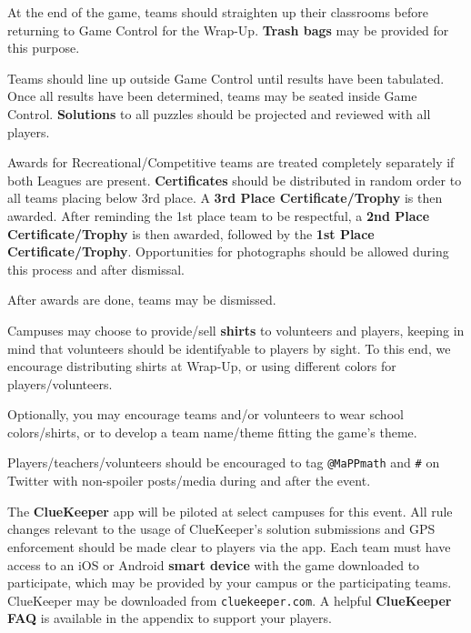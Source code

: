 
At the end of the game, teams should straighten up their classrooms before
returning to Game Control for the Wrap-Up. \textbf{Trash bags} may be
provided for this purpose.

Teams should line up outside Game Control until results have been tabulated.
Once all results have been determined, teams may be seated inside Game Control.
\textbf{Solutions} to all puzzles should be projected and reviewed with
all players.

Awards for Recreational/Competitive teams are treated completely separately
if both Leagues are present.
\textbf{Certificates} should be distributed in random order to all teams placing
below 3rd place. A \textbf{3rd Place Certificate/Trophy} is then awarded.
After reminding the 1st place team to be respectful, a
\textbf{2nd Place Certificate/Trophy} is then awarded, followed by the
\textbf{1st Place Certificate/Trophy}. Opportunities for photographs should
be allowed during this process and after dismissal.

After awards are done, teams may be dismissed.


Campuses may choose to provide/sell \textbf{shirts} to volunteers and players,
keeping in mind that volunteers should be identifyable to players by sight.
To this end, we encourage distributing shirts at Wrap-Up, or using different
colors for players/volunteers.

Optionally, you may encourage teams and/or volunteers to
wear school colors/shirts, or to develop a team name/theme fitting the
game's theme.


Players/teachers/volunteers should be encouraged to tag \texttt{@MaPPmath}
and \texttt{\#\phEventAbbr} on Twitter with non-spoiler posts/media during
and after the event.


The \textbf{ClueKeeper} app will be piloted at select campuses for this
event. All rule changes relevant to the usage of ClueKeeper's
solution submissions and GPS enforcement should be made clear to players
via the app. Each team must have access to an iOS or Android
\textbf{smart device} with the game downloaded to participate, which
may be provided by your campus or the participating teams.
ClueKeeper may be downloaded from \texttt{cluekeeper.com}. A helpful
\textbf{ClueKeeper FAQ} is available in the appendix to support your players.

\normalsize
